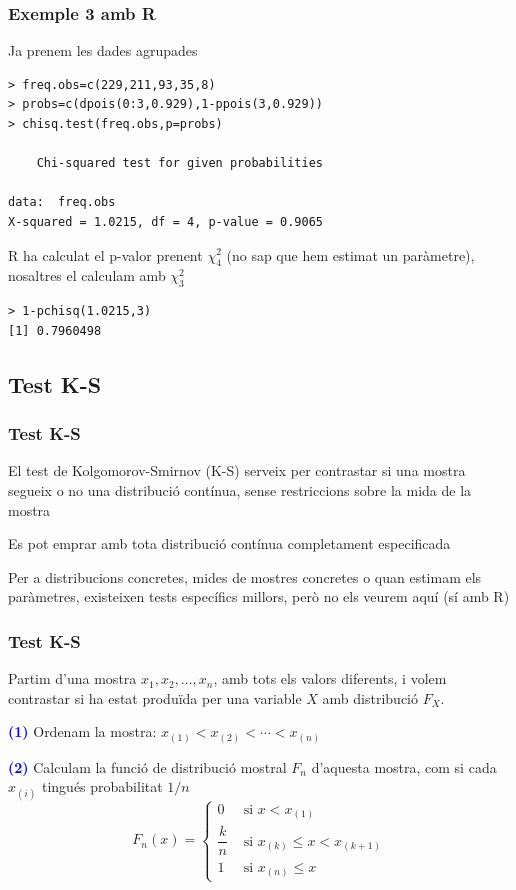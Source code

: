 \documentclass[12pt,t]{beamer}
\newcommand{\blue}[1]{\textcolor{blue}{#1}}
\renewcommand{\emph}[1]{{\color{red}#1}}
\renewcommand{\leq}{\leqslant}
\theoremstyle{plain}
\theoremstyle{definition}
\begin{document}
\begin{frame}[fragile]
\frametitle{Exemple 3 amb R}
Ja prenem les dades agrupades

\begin{verbatim}
> freq.obs=c(229,211,93,35,8)
> probs=c(dpois(0:3,0.929),1-ppois(3,0.929))
> chisq.test(freq.obs,p=probs)

	Chi-squared test for given probabilities

data:  freq.obs 
X-squared = 1.0215, df = 4, p-value = 0.9065
\end{verbatim}
\pause R ha calculat el p-valor prenent $\chi_4^2$ (no sap que hem estimat un paràmetre), nosaltres el calculam amb $\chi_3^2$
\begin{verbatim}
> 1-pchisq(1.0215,3)
[1] 0.7960498
\end{verbatim}
\end{frame}

\subsection{Test K-S}

\begin{frame}
\frametitle{Test K-S}
El \emph{test de Kolgomorov-Smirnov} (K-S) serveix per contrastar si una mostra segueix o no una distribució contínua, sense restriccions sobre la mida de la mostra
\medskip

Es pot emprar amb tota distribució contínua completament especificada
\medskip

Per a distribucions concretes, mides de mostres concretes o quan estimam els paràmetres, existeixen tests específics millors, però no els veurem aquí (sí amb R)
\end{frame}

\begin{frame}
\frametitle{Test K-S}

Partim d'una mostra $x_1,x_2,\ldots,x_n$, \emph{amb tots els valors  diferents}, i volem contrastar si ha estat produïda per una variable $X$ amb distribució $F_X$.
\medskip

\blue{\bf (1)} Ordenam la mostra: $x_{(1)}< x_{(2)}<\cdots< x_{(n)}$
\bigskip

\blue{\bf (2)} Calculam la \emph{funció de distribució mostral} $F_{n}$
d'aquesta mostra, com si cada $x_{(i)}$ tingués probabilitat $1/n$
$$
F_n(x)=\left\{\begin{array}{ll}
0 &\mbox{ si } x< x_{(1)} \\
\dfrac{k}{n}&\mbox{ si } x_{(k)}\leq x < x_{(k+1)}\\[2ex]
1 & \mbox{ si } x_{(n)} \leq x
\end{array}
\right.
$$


\end{frame}
\end{document}
